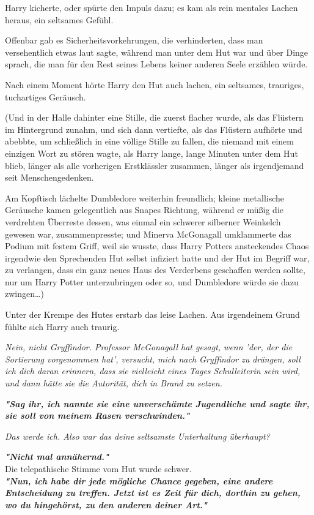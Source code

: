 {Harry kicherte, oder spürte den Impuls dazu; es kam als rein mentales Lachen heraus, ein seltsames Gefühl.

Offenbar gab es Sicherheitsvorkehrungen, die verhinderten, dass man versehentlich etwas laut sagte, während man unter dem Hut war und über Dinge sprach, die man für den Rest seines Lebens keiner anderen Seele erzählen würde.

Nach einem Moment hörte Harry den Hut auch lachen, ein seltsames, trauriges, tuchartiges Geräusch.

(Und in der Halle dahinter eine Stille, die zuerst flacher wurde, als das Flüstern im Hintergrund zunahm, und sich dann vertiefte, als das Flüstern aufhörte und abebbte, um schließlich in eine völlige Stille zu fallen, die niemand mit einem einzigen Wort zu stören wagte, als Harry lange, lange Minuten unter dem Hut blieb, länger als alle vorherigen Erstklässler zusammen, länger als irgendjemand seit Menschengedenken.

Am Kopftisch lächelte Dumbledore weiterhin freundlich; kleine metallische Geräusche kamen gelegentlich aus Snapes Richtung, während er müßig die verdrehten Überreste dessen, was einmal ein schwerer silberner Weinkelch gewesen war, zusammenpresste; und Minerva McGonagall umklammerte das Podium mit festem Griff, weil sie wusste, dass Harry Potters ansteckendes Chaos irgendwie den Sprechenden Hut selbst infiziert hatte und der Hut im Begriff war, zu verlangen, dass ein ganz neues Haus des Verderbens geschaffen werden sollte, nur um Harry Potter unterzubringen oder so, und Dumbledore würde sie dazu zwingen…)

Unter der Krempe des Hutes erstarb das leise Lachen. Aus irgendeinem Grund fühlte sich Harry auch traurig.

\emph{Nein, nicht Gryffindor. Professor McGonagall hat gesagt, wenn 'der, der die Sortierung vorgenommen hat', versucht, mich nach Gryffindor zu drängen, soll ich dich daran erinnern, dass sie vielleicht eines Tages Schulleiterin sein wird, und dann hätte sie die Autorität, dich in Brand zu setzen.}

\textbf{\emph{"Sag ihr, ich nannte sie eine unverschämte Jugendliche und sagte ihr, sie soll von meinem Rasen verschwinden."}}

\emph{Das werde ich. Also war das deine seltsamste Unterhaltung überhaupt?}

\textbf{\emph{"Nicht mal annähernd."}}\\ Die telepathische Stimme vom Hut wurde schwer.\\ \textbf{\emph{"Nun, ich habe dir jede mögliche Chance gegeben, eine andere Entscheidung zu treffen. Jetzt ist es Zeit für dich, dorthin zu gehen, wo du hingehörst, zu den anderen deiner Art."}}

}

